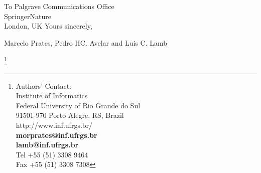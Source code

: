 \documentclass[10pt]{letter} %
\begin{document}
\begin{letter}{To Palgrave Communications Office\\
SpringerNature\\
London, UK
 }
Yours sincerely,\\



\begin{flushleft}
Marcelo Prates, Pedro HC. Avelar and Luis C. Lamb
 \end{flushleft}


\let\thefootnote\relax\footnote{Authors' Contact:\\
Institute of Informatics \\
Federal University of Rio Grande do Sul\\ 
91501-970 Porto Alegre, RS, Brazil \\
http://www.inf.ufrgs.br/  \\
\textbf{morprates@inf.ufrgs.br}\\
\textbf{lamb@inf.ufrgs.br}\\
Tel +55 (51) 3308 9464 \\
Fax +55 (51) 3308 7308}



\end{letter}
\end{document}
